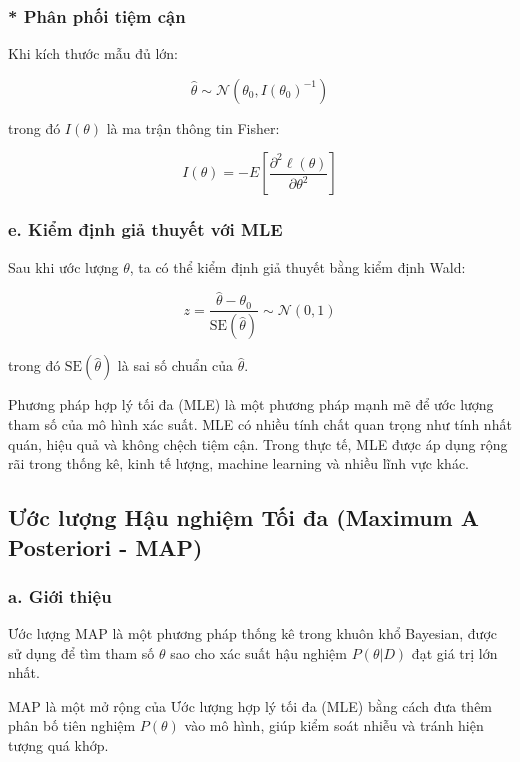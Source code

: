 \subsubsection{* Phân phối tiệm cận}
Khi kích thước mẫu đủ lớn:

\begin{equation}
\hat{\theta} \sim \mathcal{N}(\theta_0, I(\theta_0)^{-1})
\end{equation}

trong đó $I(\theta)$ là ma trận thông tin Fisher:

\begin{equation}
I(\theta) = -E \left[ \frac{\partial^2 \ell(\theta)}{\partial \theta^2} \right]
\end{equation}

\subsubsection{e. Kiểm định giả thuyết với MLE}
Sau khi ước lượng $\theta$, ta có thể kiểm định giả thuyết bằng kiểm định Wald:

\begin{equation}
z = \frac{\hat{\theta} - \theta_0}{\text{SE}(\hat{\theta})} \sim \mathcal{N}(0,1)
\end{equation}

trong đó $\text{SE}(\hat{\theta})$ là sai số chuẩn của $\hat{\theta}$.

Phương pháp hợp lý tối đa (MLE) là một phương pháp mạnh mẽ để ước lượng tham số của mô hình xác suất. MLE có nhiều tính chất quan trọng như tính nhất quán, hiệu quả và không chệch tiệm cận. Trong thực tế, MLE được áp dụng rộng rãi trong thống kê, kinh tế lượng, machine learning và nhiều lĩnh vực khác.

\subsection{Ước lượng Hậu nghiệm Tối đa (Maximum A Posteriori - MAP)}
\subsubsection{a. Giới thiệu}
Ước lượng MAP là một phương pháp thống kê trong khuôn khổ Bayesian, được sử dụng để tìm tham số $\theta$ sao cho xác suất hậu nghiệm $P(\theta | D)$ đạt giá trị lớn nhất.

MAP là một mở rộng của Ước lượng hợp lý tối đa (MLE) bằng cách đưa thêm phân bố tiên nghiệm $P(\theta)$ vào mô hình, giúp kiểm soát nhiễu và tránh hiện tượng quá khớp.

